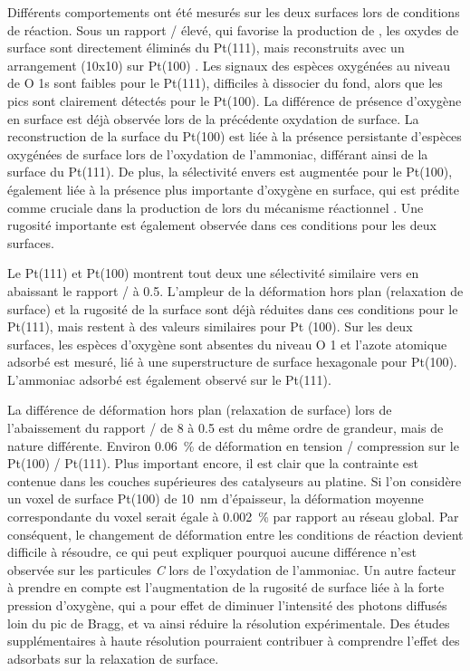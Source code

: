 {Différents comportements ont été mesurés sur les deux surfaces lors de conditions de réaction.
Sous un rapport / élevé, qui favorise la production de , les oxydes de surface sont directement éliminés du Pt(111), mais reconstruits avec un arrangement (10x10) sur Pt(100) .
Les signaux des espèces oxygénées au niveau de O 1s sont faibles pour le Pt(111), difficiles à dissocier du fond, alors que les pics sont clairement détectés pour le Pt(100).
La différence de présence d’oxygène en surface est déjà observée lors de la précédente oxydation de surface.
La reconstruction de la surface du Pt(100) est liée à la présence persistante d'espèces oxygénées de surface lors de l'oxydation de l'ammoniac, différant ainsi de la surface du Pt(111).
De plus, la sélectivité envers  est augmentée pour le Pt(100), également liée à la présence plus importante d'oxygène en surface, qui est prédite comme cruciale dans la production de  lors du mécanisme réactionnel \parencite{NovellLeruth2005, Offermans2006, Offermans2007, Imbihl2007, NovellLeruth2008}.
Une rugosité importante est également observée dans ces conditions pour les deux surfaces.

Le Pt(111) et Pt(100) montrent tout deux une sélectivité similaire vers  en abaissant le rapport / à \num{0,5}.
L'ampleur de la déformation hors plan (relaxation de surface) et la rugosité de la surface sont déjà réduites dans ces conditions pour le Pt(111), mais restent à des valeurs similaires pour Pt (100).
Sur les deux surfaces, les espèces d'oxygène sont absentes du niveau O 1 et l'azote atomique adsorbé est mesuré, lié à une superstructure de surface hexagonale pour Pt(100).
L'ammoniac adsorbé est également observé sur le Pt(111).

La différence de déformation hors plan (relaxation de surface) lors de l'abaissement du rapport / de \num{8} à \num{0,5} est du même ordre de grandeur, mais de nature différente.
Environ \qty{0,06}{\percent} de déformation en tension / compression sur le Pt(100) / Pt(111).
Plus important encore, il est clair que la contrainte est contenue dans les couches supérieures des catalyseurs au platine.
Si l'on considère un voxel de surface Pt(100) de \qty{10}{\nm} d'épaisseur, la déformation moyenne correspondante du voxel serait égale à \qty{0,002}{\percent} par rapport au réseau global.
Par conséquent, le changement de déformation entre les conditions de réaction devient difficile à résoudre, ce qui peut expliquer pourquoi aucune différence n'est observée sur les particules \textit{C} lors de l'oxydation de l'ammoniac.
Un autre facteur à prendre en compte est l'augmentation de la rugosité de surface liée à la forte pression d'oxygène, qui a pour effet de diminuer l'intensité des photons diffusés loin du pic de Bragg, et va ainsi réduire la résolution expérimentale.
Des études supplémentaires à haute résolution pourraient contribuer à comprendre l’effet des adsorbats sur la relaxation de surface.

}
